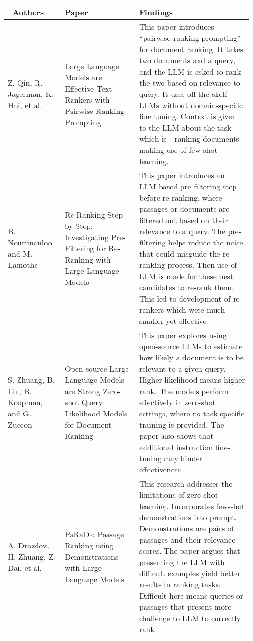 \begin{center}
\begin{tabular}{ |p{2cm}||p{=2.7cm}|p{9cm}|  }
 \hline
 \ Authors & Paper & Findings\\
 \hline
  {Z. Qin, R. Jagerman, K. Hui, et al. \cite{rerank1}}&{Large Language Models are Effective Text Rankers with Pairwise Ranking Prompting}&{This paper introduces “pairwise ranking prompting” for document ranking. It takes two documents and a query, and the LLM is asked to rank the two based on relevance to query. It uses off the shelf LLMs without domain-specific fine tuning. Context is given to the LLM about the task which is - ranking documents making use of few-shot learning.}\\
 \hline
  { B. Nouriinanloo and M. Lamothe \cite{rerank2}} & {Re-Ranking Step by Step: Investigating Pre-Filtering for Re-Ranking with Large Language Models}&{This paper introduces an LLM-based pre-filtering step before re-ranking, where passages or documents are filtered out based on their relevance to a query. The pre-filtering helps reduce the noise that could misguide the re-ranking process. Then use of LLM is made for these best candidates to re-rank them. This led to development of re-rankers which were much smaller yet effective}\\
  \hline
  {S. Zhuang, B. Liu, B. Koopman, and G. Zuccon \cite{rerank3}} & {Open-source Large Language Models are Strong Zero-shot Query Likelihood Models for Document Ranking}&{This paper explores using open-source LLMs to estimate how likely a document is to be relevant to a given query. Higher likelihood means higher rank. The models perform effectively in zero-shot settings, where no task-specific training is provided. The paper also shows that additional instruction fine-tuning may hinder effectiveness}\\
  \hline
  {A. Drozdov, H. Zhuang, Z. Dai, et al. \cite{rerank4}} & {PaRaDe: Passage Ranking using Demonstrations with Large Language Models}&{This research addresses the limitations of zero-shot learning. Incorporates few-shot demonstrations into prompt. Demonstrations are pairs of passages and their relevance scores. The paper argues that presenting the LLM with difficult examples yield better results in ranking tasks. Difficult here means queries or passages that present more challenge to LLM to correctly rank}\\
  \hline
\end{tabular}
\end{center}
\vspace{-0.75cm}
